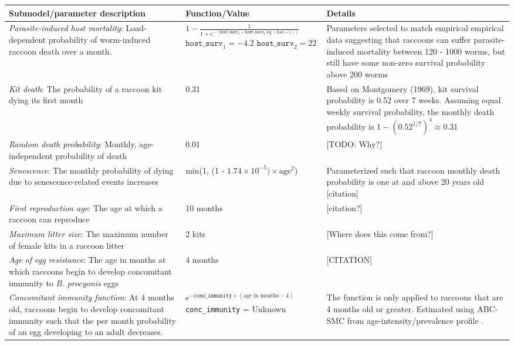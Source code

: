 \documentclass[11pt]{article}
\begin{document}
\linespread{1}
\scriptsize
\renewcommand{\arraystretch}{1.2}
\begin{longtable}{p{4.5cm} p{4.5cm} p{5cm}}
\toprule
\textbf{Submodel/parameter description} & \textbf{Function/Value} & \textbf{Details} \\
\midrule
\emph{Parasite-induced host mortality}: Load-dependent
probability of worm-induced raccoon death over a month. &
$1 - \frac{1}{1 + e^{-(\texttt{host\_surv}_1 + \texttt{host\_surv}_2 \log(\text{load} + 1))}}$ \newline\newline $\texttt{host\_surv}_1 = -4.2$ \newline $\texttt{host\_surv}_2 = 22$ & Parameters selected to match empirical empirical data suggesting that raccoons can suffer parasite-induced mortality between 120 - 1000 worms, but still have some non-zero survival probability above 200 worms \citep{Kazacos2001} \\
\hline
\emph{Kit death}: The probability of a raccoon kit dying its first month & 0.31 & Based on Montgomery (1969), kit survival probability is 0.52 over 7 weeks. Assuming equal weekly survival probability, the monthly death probability is $1 - (0.52^{1/7})^4 \approx 0.31$   \\
\hline
\emph{Random death probability}: Monthly, age-independent probability of death & 0.01 & [TODO: Why?] \\
\hline
\emph{Senescence}: The monthly probability of dying due to senescence-related events increases & min(1, (1 - $1.74\times10^{-5}) \times \text{age}^2$) & Parameterized such that raccoon monthly death probability is one at and above 20 years old [citation] \\
\hline
\emph{First reproduction age}: The age at which a raccoon can reproduce & 10 months & [citation?] \\
\hline
\emph{Maximum litter size}: The maximum number of female kits in a raccoon litter & 2 kits & [Where does this come from?] \\
\hline
\emph{Age of egg resistance}: The age in months at which raccoons begin to develop concomitant immunity to \emph{B. procyonis} eggs & 4 months & [CITATION]  \\
\hline
\emph{Concomitant immunity function}: At 4 months old, raccoons begin to develop concomitant immunity such that the per month probability of an egg developing to an adult decreases. & $e^{-\texttt{conc\_immunity} \times (\text{age in months} - 4)}$ \newline\newline \texttt{conc\_immunity} = Unknown  &  The function is only applied to raccoons that are 4 months old or greater. Estimated using ABC-SMC from age-intensity/prevalence profile \citep{Weinstein2016}. \\

\end{longtable}
\end{document}

